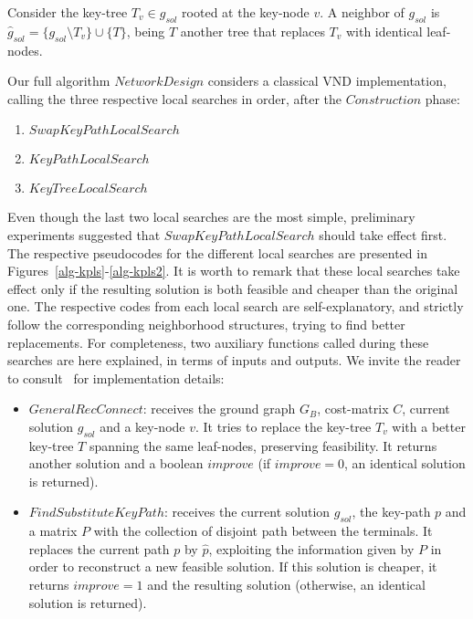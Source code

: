 \documentclass{llncs}
\begin{document}
\begin{definition}
Consider the key-tree $T_v \in g_{sol}$ rooted at the key-node $v$.  
A neighbor of $g_{sol}$ is $\hat{g}_{sol} = \{ g_{sol}\setminus T_v \} \cup \{T\}$, being 
$T$ another tree that replaces $T_v$ with identical leaf-nodes. 
\end{definition}

Our full algorithm $NetworkDesign$ considers a classical VND implementation, calling the three respective local searches in order, after the $Construction$ phase:
\begin{enumerate}
\item $SwapKeyPathLocalSearch$
\item $KeyPathLocalSearch$
\item $KeyTreeLocalSearch$
\end{enumerate}
Even though the last two local searches are the most simple, preliminary experiments 
suggested that $SwapKeyPathLocalSearch$ should take effect first. 
The respective pseudocodes for the different local searches are presented in Figures~\ref{alg-kpls}-\ref{alg-kpls2}. It is worth to remark that these local searches take effect only if the resulting solution is both feasible and cheaper than the original one. The respective codes from each local search are self-explanatory, and strictly follow  the corresponding neighborhood structures, trying to find better replacements. For completeness, two auxiliary functions 
called during these searches are here explained, in terms of inputs and outputs. 
We invite the reader to consult~\cite{117} for implementation details:
\begin{itemize}
\item $GeneralRecConnect$: receives the ground graph $G_B$, cost-matrix $C$, current solution $g_{sol}$ and a 
key-node $v$. It tries to replace the key-tree $T_v$ with a better key-tree $T$ spanning the same leaf-nodes, preserving feasibility. It returns another solution and a boolean $improve$ (if $improve=0$, an identical solution is returned).
\item $FindSubstituteKeyPath$: receives the current solution $g_{sol}$, the key-path $p$ and a matrix $P$ with the 
collection of disjoint path between the terminals. It replaces the current path $p$ by $\hat{p}$, exploiting the information given by $P$ in order to reconstruct a new feasible solution. If this solution is cheaper, it returns $improve=1$ 
and the resulting solution (otherwise, an identical solution is returned). 
\end{itemize}
\end{document}
